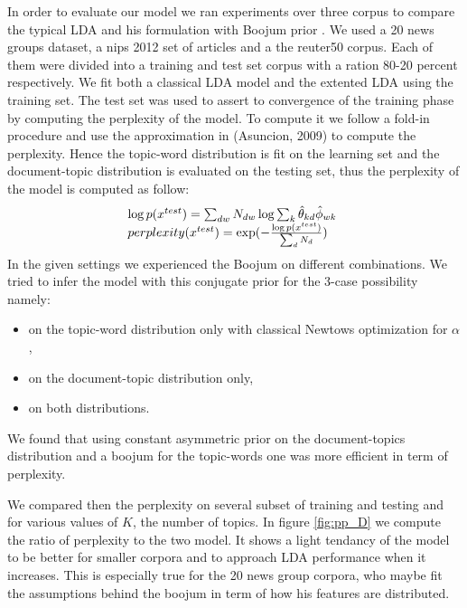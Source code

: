 In order to evaluate our model we ran experiments over three corpus to compare the typical LDA and his formulation with Boojum prior . We used a 20 news groups dataset, a nips 2012 set of articles and a the reuter50 corpus. Each of them were divided into a training and test set corpus with a ration 80-20 percent respectively. We fit both a classical LDA model and the extented LDA using the training set. The test set was used to assert to convergence of the training phase by computing the perplexity of the model. To compute it we follow a fold-in procedure and  use the approximation in (Asuncion, 2009) to compute the perplexity. Hence the topic-word distribution is fit on the learning set and the document-topic distribution is evaluated on the testing set, thus the perplexity of the model is computed as follow: 
\[
\begin{array}{l@{\hspace{.3cm}}l}
\log p(x^{test}) = \sum_{dw} N_{dw} \log \sum_k \hat{\theta}_{kd} \hat{\phi}_{wk} \\
perplexity(x^{test}) = \exp(- \frac{\log p(x^{test})}{\sum_d N_d})
\end{array}
\]
In the given settings we experienced the Boojum on different combinations. We tried to infer the model with this conjugate prior for the 3-case possibility namely:
\begin{itemize}
\item on the topic-word distribution only with classical Newtows optimization for $\alpha$,
\item on the document-topic distribution only,
\item on both distributions. 
\end{itemize}
We found that using constant asymmetric prior on the document-topics distribution and a boojum for the topic-words one was more efficient in term of perplexity.

We compared then the perplexity on several subset of training and testing and for various values of $K$, the number of topics. In figure \ref{fig:pp_D} we compute the ratio of perplexity to the two model. It shows a light tendancy of the model to be better for smaller corpora and to approach LDA performance when it increases. This is especially true for the 20 news group corpora, who maybe fit the assumptions behind the boojum in term of how his features are distributed. 

